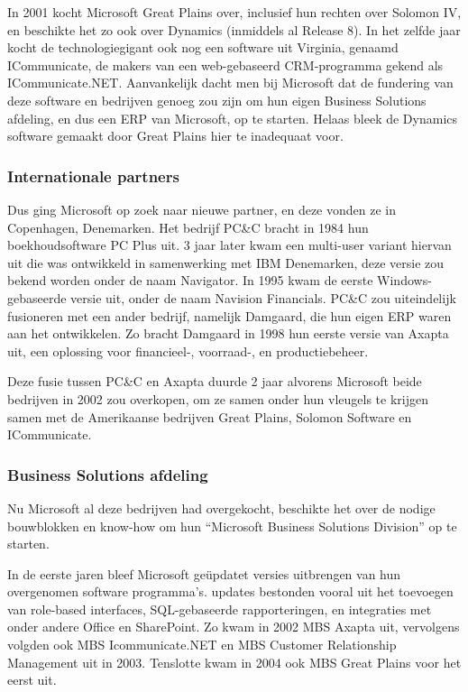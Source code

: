In 2001 kocht Microsoft Great Plains over, inclusief hun rechten over Solomon IV, en beschikte het zo ook over Dynamics (inmiddels al Release 8). In het zelfde jaar kocht de technologiegigant ook nog een software uit Virginia, genaamd ICommunicate, de makers van een web-gebaseerd CRM-programma gekend als ICommunicate.NET. Aanvankelijk dacht men bij Microsoft dat de fundering van deze software en bedrijven genoeg zou zijn om hun eigen Business Solutions afdeling, en dus een ERP van Microsoft, op te starten. Helaas bleek de Dynamics software gemaakt door Great Plains hier te inadequaat voor. 

\subsubsection{Internationale partners }
Dus ging Microsoft op zoek naar nieuwe partner, en deze vonden ze in Copenhagen, Denemarken. Het bedrijf PC\&C bracht in 1984 hun boekhoudsoftware PC Plus uit. 3 jaar later kwam een multi-user variant hiervan uit die was ontwikkeld in samenwerking met IBM Denemarken, deze versie zou bekend worden onder de naam Navigator. In 1995 kwam de eerste Windows-gebaseerde versie uit, onder de naam Navision Financials. PC\&C zou uiteindelijk fusioneren met een ander bedrijf, namelijk Damgaard, die hun eigen ERP waren aan het ontwikkelen. Zo bracht Damgaard in 1998 hun eerste versie van Axapta uit, een oplossing voor financieel-, voorraad-, en productiebeheer.

Deze fusie tussen PC\&C en Axapta duurde 2 jaar alvorens Microsoft beide bedrijven in 2002 zou overkopen, om ze samen onder hun vleugels te krijgen samen met de Amerikaanse bedrijven Great Plains,  Solomon Software en ICommunicate. 

\subsubsection{Business Solutions afdeling}
Nu Microsoft al deze bedrijven had overgekocht, beschikte het over de nodige bouwblokken en know-how om hun “Microsoft Business Solutions Division” op te starten. 

In de eerste jaren bleef Microsoft geüpdatet versies uitbrengen van hun overgenomen software programma’s. updates bestonden vooral uit het toevoegen van role-based interfaces, SQL-gebaseerde rapporteringen, en integraties met onder andere Office en SharePoint.  Zo kwam in 2002 MBS Axapta uit, vervolgens volgden ook MBS Icommunicate.NET en MBS Customer Relationship Management uit in 2003. Tenslotte kwam in 2004 ook MBS Great Plains voor het eerst uit. 

